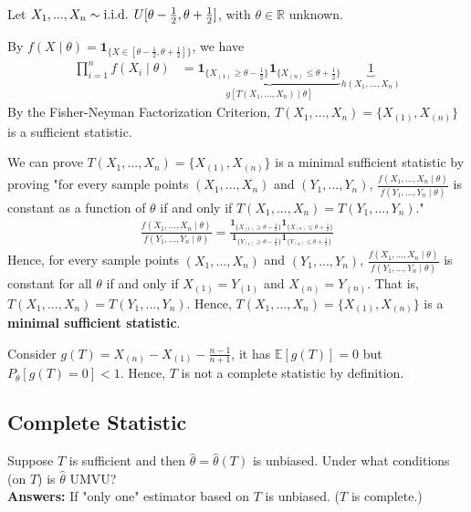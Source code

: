 \documentclass[11pt]{elegantbook}
\begin{document}
\begin{example}
    Let $X_1,...,X_n\sim \textnormal{i.i.d. }U[\theta -\frac{1}{2},\theta + \frac{1}{2}]$, with $\theta \in \mathbb{R}$ unknown.

    By $f(X\mid\theta)=\mathbf{1}_{\{X\in[\theta-\frac{1}{2},\theta+\frac{1}{2}]\}}$, we have
    \begin{equation}
        \begin{aligned}
            \prod_{i=1}^n f(X_i\mid\theta)&=\underbrace{\mathbf{1}_{\{X_{(1)}\geq\theta-\frac{1}{2}\}}\mathbf{1}_{\{X_{(n)}\leq\theta+\frac{1}{2}\}}}_{g[T(X_1,...,X_n)\mid\theta]}\underbrace{1}_{h(X_1,...,X_n)}
        \end{aligned}
        \nonumber
    \end{equation}
    By the Fisher-Neyman Factorization Criterion, $T(X_1,...,X_n)=\{X_{(1)},X_{(n)}\}$ is a sufficient statistic.

    We can prove $T(X_1,...,X_n)=\{X_{(1)},X_{(n)}\}$ is a minimal sufficient statistic by proving "for every sample points $(X_1,...,X_n)$ and $(Y_1,...,Y_n)$, $\frac{f(X_1,...,X_n\mid\theta)}{f(Y_1,...,Y_n\mid\theta)}$ is constant as a function of $\theta$ if and only if $T(X_1,...,X_n)=T(Y_1,...,Y_n)$."
    \begin{equation}
        \begin{aligned}
            \frac{f(X_1,...,X_n\mid\theta)}{f(Y_1,...,Y_n\mid\theta)}=\frac{\mathbf{1}_{\{X_{(1)}\geq\theta-\frac{1}{2}\}}\mathbf{1}_{\{X_{(n)}\leq\theta+\frac{1}{2}\}}}{\mathbf{1}_{\{Y_{(1)}\geq\theta-\frac{1}{2}\}}\mathbf{1}_{\{Y_{(n)}\leq\theta+\frac{1}{2}\}}}
        \end{aligned}
        \nonumber
    \end{equation}
    Hence, for every sample points $(X_1,...,X_n)$ and $(Y_1,...,Y_n)$, $\frac{f(X_1,...,X_n\mid\theta)}{f(Y_1,...,Y_n\mid\theta)}$ is constant for all $\theta$ if and only if $X_{(1)}=Y_{(1)}$ and $X_{(n)}=Y_{(n)}$. That is, $T(X_1,...,X_n)=T(Y_1,...,Y_n)$. Hence, $T(X_1,...,X_n)=\{X_{(1)},X_{(n)}\}$ is a \textbf{minimal sufficient statistic}.

    Consider $g(T)=X_{(n)}-X_{(1)}-\frac{n-1}{n+1}$, it has $\mathbb{E}[g(T)]=0$ but $P_\theta[g(T)=0]<1$. Hence, $T$ is not a complete statistic by definition.
\end{example}



\subsection{Complete Statistic}
Suppose $T$ is sufficient and then $\hat{\theta}=\hat{\theta}(T)$ is unbiased. Under what conditions (on $T$) is $\hat{\theta}$ UMVU?\\
\textbf{Answers:} If "only one" estimator based on $T$ is unbiased. ($T$ is complete.)
\end{document}
